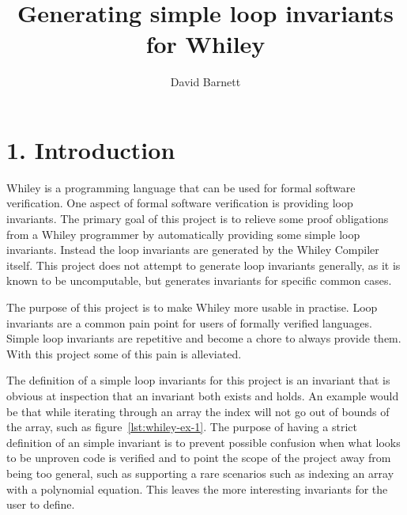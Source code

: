 \documentclass[11pt, a4paper, twoside, openright]{report}
\title{Generating simple loop invariants for Whiley}
\author{David Barnett}
\date{}
\begin{document}
\frontmatter


\begin{abstract}
\end{abstract}


\maketitle


\mainmatter{}

\section*{1. Introduction}

Whiley is a programming language that can be used for formal software
verification. One aspect of formal software verification is providing loop
invariants.
The primary goal of this project is to relieve some proof obligations from a
Whiley programmer by automatically providing some simple loop invariants.
Instead the loop invariants are generated by the Whiley Compiler itself.
This project does not attempt to generate loop invariants generally, as it is
known to be uncomputable, but generates invariants for specific common cases.

The purpose of this project is to make Whiley more usable in practise.
Loop invariants are a common pain point for users of formally verified
languages. Simple loop invariants are repetitive and become a chore to
always provide them. With this project some of this pain is alleviated.


The definition of a simple loop invariants for this project is an invariant that is
obvious at inspection that an invariant both exists and holds.
An example would be that while iterating through an array the index
will not go out of bounds of the array, such as figure~\ref{lst:whiley-ex-1}.
The purpose of having a strict definition of an simple invariant is to prevent
possible confusion when what looks to be unproven code is verified and to point
the scope of the project away from being too general, such as supporting
a rare scenarios such as indexing an array with a polynomial equation.
This leaves the more interesting invariants for the user to define.
\end{document}
